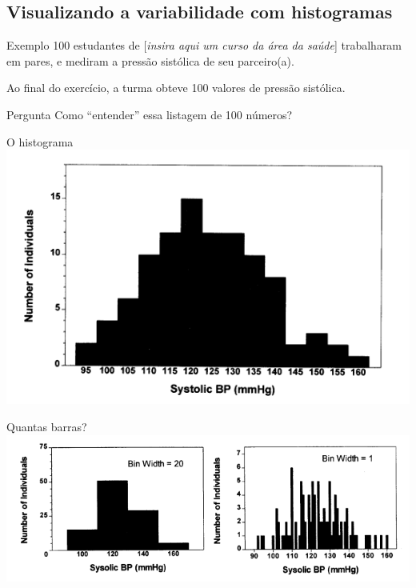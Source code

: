 \documentclass{beamer}
\begin{document}
\subsection{Visualizando a variabilidade com histogramas}

\begin{frame}
  \begin{exampleblock}{Exemplo}
    \footnotesize
    100 estudantes de [{\em insira aqui um curso da área da saúde}] trabalharam em pares, e mediram a pressão sistólica de seu parceiro(a).

    Ao final do exercício, a turma obteve 100 valores de pressão sistólica.
  \end{exampleblock}
  \begin{block}{Pergunta}
    \footnotesize
    Como ``entender'' essa listagem de 100 números?
  \end{block}
\end{frame}

\begin{frame}{\scriptsize O histograma}
  \includegraphics[height=\textheight]{Cap3/histograma1}
\end{frame}

\begin{frame}{\scriptsize Quantas barras?}
  \includegraphics[width=\textwidth]{Cap3/histograma2}
\end{frame}
\end{document}
